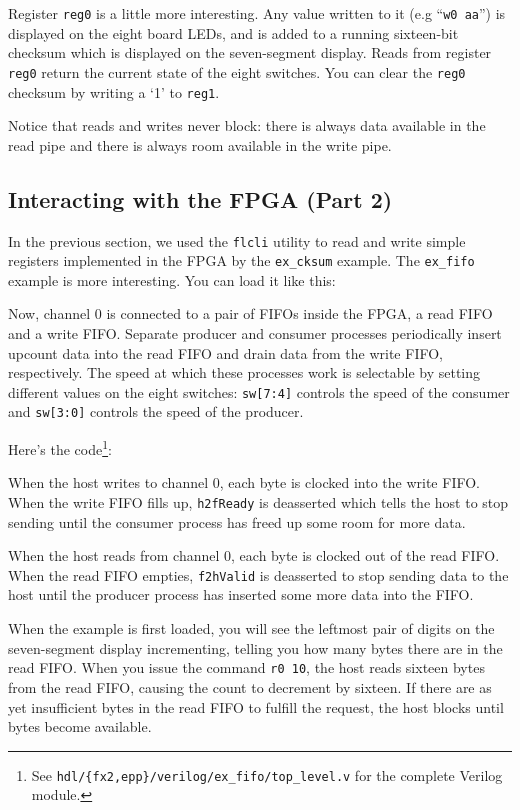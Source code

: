 Register \texttt{reg0} is a little more interesting. Any value written to it (e.g ``\texttt{w0 aa}'') is displayed on the eight board LEDs, and is added to a running sixteen-bit checksum which is displayed on the seven-segment display. Reads from register \texttt{reg0} return the current state of the eight switches. You can clear the \texttt{reg0} checksum by writing a `1' to \texttt{reg1}.

Notice that reads and writes never block: there is always data available in the read pipe and there is always room available in the write pipe.

\subsection{Interacting with the FPGA (Part 2)}
In the previous section, we used the \texttt{flcli} utility to read and write simple registers implemented in the FPGA by the \texttt{ex\_cksum} example. The \texttt{ex\_fifo} example is more interesting. You can load it like this:


Now, channel 0 is connected to a pair of FIFOs inside the FPGA, a read FIFO and a write FIFO. Separate producer and consumer processes periodically insert upcount data into the read FIFO and drain data from the write FIFO, respectively. The speed at which these processes work is selectable by setting different values on the eight switches: \texttt{sw[7:4]} controls the speed of the consumer and \texttt{sw[3:0]} controls the speed of the producer.

Here's the code\footnote{See \texttt{hdl/\{fx2,epp\}/verilog/ex\_fifo/top\_level.v} for the complete Verilog module.}:


When the host writes to channel 0, each byte is clocked into the write FIFO. When the write FIFO fills up, \texttt{h2fReady} is deasserted which tells the host to stop sending until the consumer process has freed up some room for more data.

When the host reads from channel 0, each byte is clocked out of the read FIFO. When the read FIFO empties, \texttt{f2hValid} is deasserted to stop sending data to the host until the producer process has inserted some more data into the FIFO.

When the example is first loaded, you will see the leftmost pair of digits on the seven-segment display incrementing, telling you how many bytes there are in the read FIFO. When you issue the command \texttt{r0 10}, the host reads sixteen bytes from the read FIFO, causing the count to decrement by sixteen. If there are as yet insufficient bytes in the read FIFO to fulfill the request, the host blocks until bytes become available.

